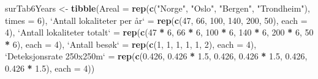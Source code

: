 \documentclass[]{article}
\newenvironment{Shaded}{\begin{snugshade}}{\end{snugshade}}
\newcommand{\KeywordTok}[1]{\textcolor[rgb]{0.13,0.29,0.53}{\textbf{#1}}}
\newcommand{\DataTypeTok}[1]{\textcolor[rgb]{0.13,0.29,0.53}{#1}}
\newcommand{\DecValTok}[1]{\textcolor[rgb]{0.00,0.00,0.81}{#1}}
\newcommand{\FloatTok}[1]{\textcolor[rgb]{0.00,0.00,0.81}{#1}}
\newcommand{\StringTok}[1]{\textcolor[rgb]{0.31,0.60,0.02}{#1}}
\newcommand{\OperatorTok}[1]{\textcolor[rgb]{0.81,0.36,0.00}{\textbf{#1}}}
\newcommand{\NormalTok}[1]{#1}
\begin{document}
\begin{Shaded}
\begin{Highlighting}[]
\NormalTok{surTab6Years <-}\StringTok{ }\KeywordTok{tibble}\NormalTok{(}\DataTypeTok{Areal =} \KeywordTok{rep}\NormalTok{(}\KeywordTok{c}\NormalTok{(}\StringTok{"Norge"}\NormalTok{, }\StringTok{"Oslo"}\NormalTok{, }\StringTok{"Bergen"}\NormalTok{, }\StringTok{"Trondheim"}\NormalTok{), }
    \DataTypeTok{times =} \DecValTok{6}\NormalTok{), }\StringTok{`}\DataTypeTok{Antall lokaliteter per år}\StringTok{`}\NormalTok{ =}\StringTok{ }\KeywordTok{rep}\NormalTok{(}\KeywordTok{c}\NormalTok{(}\DecValTok{47}\NormalTok{, }\DecValTok{66}\NormalTok{, }\DecValTok{100}\NormalTok{, }\DecValTok{140}\NormalTok{, }\DecValTok{200}\NormalTok{, }
    \DecValTok{50}\NormalTok{), }\DataTypeTok{each =} \DecValTok{4}\NormalTok{), }\StringTok{`}\DataTypeTok{Antall lokaliteter totalt}\StringTok{`}\NormalTok{ =}\StringTok{ }\KeywordTok{rep}\NormalTok{(}\KeywordTok{c}\NormalTok{(}\DecValTok{47} \OperatorTok{*}\StringTok{ }\DecValTok{6}\NormalTok{, }\DecValTok{66} \OperatorTok{*}\StringTok{ }\DecValTok{6}\NormalTok{, }\DecValTok{100} \OperatorTok{*}\StringTok{ }
\StringTok{    }\DecValTok{6}\NormalTok{, }\DecValTok{140} \OperatorTok{*}\StringTok{ }\DecValTok{6}\NormalTok{, }\DecValTok{200} \OperatorTok{*}\StringTok{ }\DecValTok{6}\NormalTok{, }\DecValTok{50} \OperatorTok{*}\StringTok{ }\DecValTok{6}\NormalTok{), }\DataTypeTok{each =} \DecValTok{4}\NormalTok{), }\StringTok{`}\DataTypeTok{Antall besøk}\StringTok{`}\NormalTok{ =}\StringTok{ }\KeywordTok{rep}\NormalTok{(}\KeywordTok{c}\NormalTok{(}\DecValTok{1}\NormalTok{, }\DecValTok{1}\NormalTok{, }\DecValTok{1}\NormalTok{, }
    \DecValTok{1}\NormalTok{, }\DecValTok{1}\NormalTok{, }\DecValTok{2}\NormalTok{), }\DataTypeTok{each =} \DecValTok{4}\NormalTok{), }\StringTok{`}\DataTypeTok{Deteksjonsrate 250x250m}\StringTok{`}\NormalTok{ =}\StringTok{ }\KeywordTok{rep}\NormalTok{(}\KeywordTok{c}\NormalTok{(}\FloatTok{0.426}\NormalTok{, }\FloatTok{0.426} \OperatorTok{*}\StringTok{ }\FloatTok{1.5}\NormalTok{, }
    \FloatTok{0.426}\NormalTok{, }\FloatTok{0.426} \OperatorTok{*}\StringTok{ }\FloatTok{1.5}\NormalTok{, }\FloatTok{0.426}\NormalTok{, }\FloatTok{0.426} \OperatorTok{*}\StringTok{ }\FloatTok{1.5}\NormalTok{), }\DataTypeTok{each =} \DecValTok{4}\NormalTok{))}








\end{Highlighting}
\end{Shaded}
\end{document}
